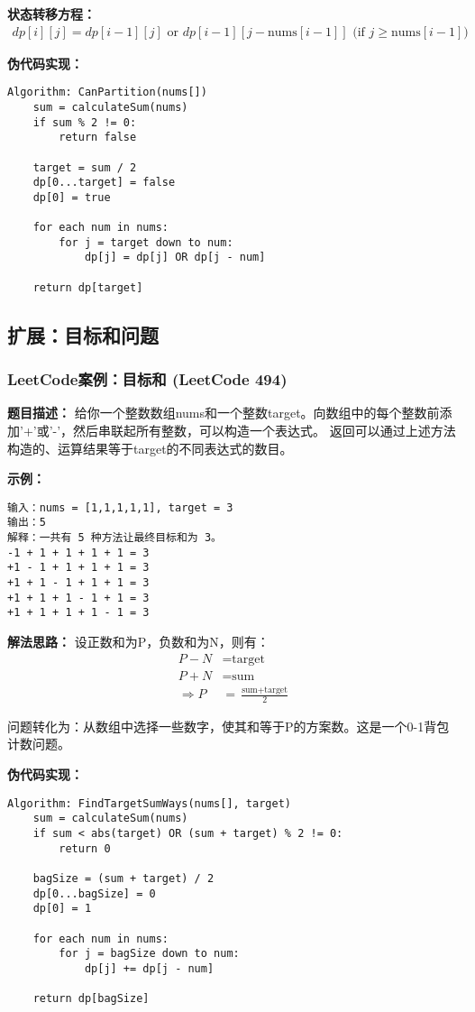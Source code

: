\textbf{状态转移方程：}
\begin{align}
dp[i][j] = dp[i-1][j] \text{ or } dp[i-1][j-\text{nums}[i-1]] \text{ (if } j \geq \text{nums}[i-1]\text{)}
\end{align}

\textbf{伪代码实现：}
\begin{verbatim}
Algorithm: CanPartition(nums[])
    sum = calculateSum(nums)
    if sum % 2 != 0:
        return false
    
    target = sum / 2
    dp[0...target] = false
    dp[0] = true
    
    for each num in nums:
        for j = target down to num:
            dp[j] = dp[j] OR dp[j - num]
    
    return dp[target]
\end{verbatim}

\subsection{扩展：目标和问题}
\subsubsection{LeetCode案例：目标和 (LeetCode 494)}
\textbf{题目描述：}
给你一个整数数组nums和一个整数target。向数组中的每个整数前添加'+'或'-'，然后串联起所有整数，可以构造一个表达式。
返回可以通过上述方法构造的、运算结果等于target的不同表达式的数目。

\textbf{示例：}
\begin{verbatim}
输入：nums = [1,1,1,1,1], target = 3
输出：5
解释：一共有 5 种方法让最终目标和为 3。
-1 + 1 + 1 + 1 + 1 = 3
+1 - 1 + 1 + 1 + 1 = 3
+1 + 1 - 1 + 1 + 1 = 3
+1 + 1 + 1 - 1 + 1 = 3
+1 + 1 + 1 + 1 - 1 = 3
\end{verbatim}

\textbf{解法思路：}
设正数和为P，负数和为N，则有：
\begin{align}
P - N &= \text{target} \\
P + N &= \text{sum} \\
\Rightarrow P &= \frac{\text{sum} + \text{target}}{2}
\end{align}

问题转化为：从数组中选择一些数字，使其和等于P的方案数。这是一个0-1背包计数问题。

\textbf{伪代码实现：}
\begin{verbatim}
Algorithm: FindTargetSumWays(nums[], target)
    sum = calculateSum(nums)
    if sum < abs(target) OR (sum + target) % 2 != 0:
        return 0
    
    bagSize = (sum + target) / 2
    dp[0...bagSize] = 0
    dp[0] = 1
    
    for each num in nums:
        for j = bagSize down to num:
            dp[j] += dp[j - num]
    
    return dp[bagSize]
\end{verbatim}

